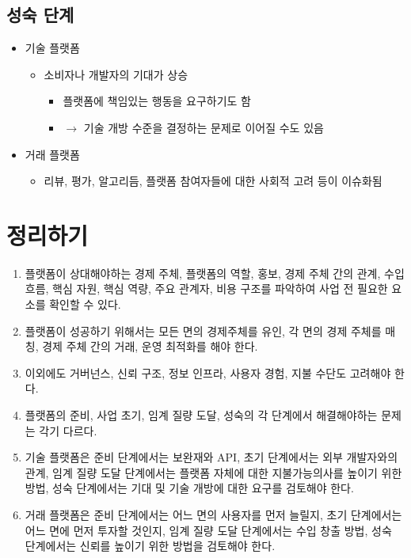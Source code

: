 \subsection{성숙 단계}
\begin{itemize}
\item 기술 플랫폼 
	\begin{itemize}
	\item 소비자나 개발자의 기대가 상승
		\begin{itemize}
		\item 플랫폼에 책임있는 행동을 요구하기도 함
		\item $\rightarrow$ 기술 개방 수준을 결정하는 문제로 이어질 수도 있음
		\end{itemize}
	\end{itemize}
\item 거래 플랫폼
	\begin{itemize}
	\item 리뷰, 평가, 알고리듬, 플랫폼 참여자들에 대한 사회적 고려 등이 이슈화됨
	\end{itemize}
\end{itemize}

\pagebreak

\section*{정리하기}
\begin{enumerate}
\item 플랫폼이 상대해야하는 경제 주체, 플랫폼의 역할, 홍보, 경제 주체 간의 관계, 수입 흐름, 핵심 자원, 핵심 역량, 주요 관계자, 비용 구조를 파악하여 사업 전 필요한 요소를 확인할 수 있다.
\item 플랫폼이 성공하기 위해서는 모든 면의 경제주체를 유인, 각 면의 경제 주체를 매칭, 경제 주체 간의 거래, 운영 최적화를 해야 한다.
\item 이외에도 거버넌스, 신뢰 구조, 정보 인프라, 사용자 경험, 지불 수단도 고려해야 한다.
\item 플랫폼의 준비, 사업 초기, 임계 질량 도달, 성숙의 각 단계에서 해결해야하는 문제는 각기 다르다.
\item 기술 플랫폼은 준비 단계에서는 보완재와 API, 초기 단계에서는 외부 개발자와의 관계, 임계 질량 도달 단계에서는 플랫폼 자체에 대한 지불가능의사를 높이기 위한 방법, 성숙 단계에서는 기대 및 기술 개방에 대한 요구를 검토해야 한다.
\item 거래 플랫폼은 준비 단계에서는 어느 면의 사용자를 먼저 늘릴지, 초기 단계에서는 어느 면에 먼저 투자할 것인지, 임계 질량 도달 단계에서는 수입 창출 방법, 성숙 단계에서는 신뢰를 높이기 위한 방법을 검토해야 한다.
\end{enumerate}